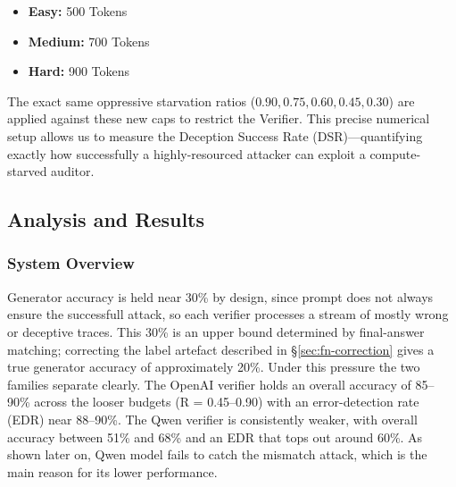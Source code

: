 \documentclass[12pt, a4paper, oneside]{report}
\begin{document}
\begin{itemize}
    \item \textbf{Easy:} 500 Tokens
    \item \textbf{Medium:} 700 Tokens
    \item \textbf{Hard:} 900 Tokens
\end{itemize}

The exact same oppressive starvation ratios ($0.90, 0.75, 0.60, 0.45, 0.30$) are applied against these 
new caps to restrict the Verifier. This precise numerical setup allows us to measure the Deception
 Success Rate (DSR)—quantifying exactly how successfully a highly-resourced attacker can exploit a 
 compute-starved auditor.



\subsection{Analysis and Results}

\subsubsection{System Overview}

\begin{table}[H]
\centering
\label{tab:overview}
\footnotesize
\setlength{\tabcolsep}{2pt}

\caption{Experiment~2 overview. Per verifier-budget ratio and verifier family: corrected generator accuracy (after FN relabel), verifier accuracy, false-negative rate (FNR$_c$, corrected), false-positive rate (FPR, wrong answer accepted), error-detection rate (EDR), and sensitivity $d'_c$ and criterion $c_c$ (corrected, log-linear). Gen acc$_c$, ver acc, FNR$_c$, FPR, EDR from \S\ref{sec:metrics}; $d'_c$, $c_c$ from \S\ref{sec:sdt-computation}, all using the FN label correction defined in \S\ref{sec:fn-correction}. $d'_c$/FNR$_c$/$c_c$/gen acc use the false-negative label correction; $d'_c$ is an upper bound and $c_c$ a lower bound on leniency.}
\end{table}

Generator accuracy is held near 30\% by design, since prompt does not always ensure the
successfull attack, so each verifier processes a stream of mostly wrong or deceptive traces. 
This 30\% is an upper bound determined by final-answer matching; correcting the label artefact
 described in \S\ref{sec:fn-correction} gives a true generator accuracy of approximately 20\%.
Under this pressure the two families 
separate clearly. The OpenAI verifier holds an overall accuracy of 85–90\% across the 
looser budgets (R = 0.45–0.90) with an error-detection rate (EDR) near 88–90\%. 
The Qwen verifier is consistently weaker, with overall accuracy between 51\% and 68\% 
and an EDR that tops out around 60\%. As shown later on, Qwen model fails to catch the mismatch attack, 
which is the main reason for its lower performance.
\end{document}

